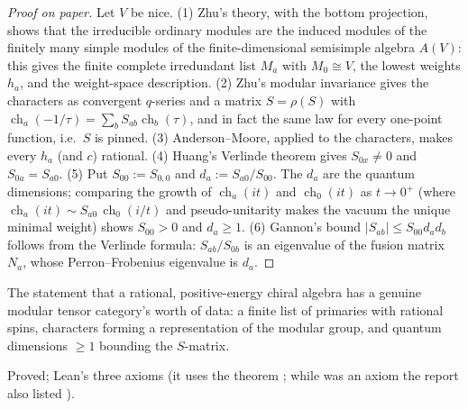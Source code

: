 \begin{proof}[Proof on paper]
Let $V$ be nice. (1) Zhu's theory, with the bottom projection, shows that the irreducible ordinary modules are the
induced modules of the finitely many simple modules of the finite-dimensional semisimple algebra $A(V)$: this gives the
finite complete irredundant list $M_a$ with $M_0\cong V$, the lowest weights $h_a$, and the weight-space description.
(2) Zhu's modular invariance gives the characters as convergent $q$-series and a matrix $S=\rho(S)$ with
$\operatorname{ch}_a(-1/\tau)=\sum_bS_{ab}\operatorname{ch}_b(\tau)$, and in fact the same law for every one-point
function, i.e.\ $S$ is pinned. (3) Anderson--Moore, applied to the characters, makes every $h_a$ (and $c$) rational. (4)
Huang's Verlinde theorem gives $S_{0x}\ne0$ and $S_{0a}=S_{a0}$. (5) Put $S_{00}:=S_{0,0}$ and $d_a:=S_{a0}/S_{00}$. The
$d_a$ are the quantum dimensions; comparing the growth of $\operatorname{ch}_a(it)$ and $\operatorname{ch}_0(it)$ as
$t\to0^+$ (where $\operatorname{ch}_a(it)\sim S_{a0}\,\operatorname{ch}_0(i/t)$ and pseudo-unitarity makes the vacuum
the unique minimal weight) shows $S_{00}>0$ and $d_a\ge1$. (6) Gannon's bound $|S_{ab}|\le S_{00}d_ad_b$ follows from
the Verlinde formula: $S_{ab}/S_{0b}$ is an eigenvalue of the fusion matrix $N_a$, whose Perron--Frobenius eigenvalue is
$d_a$.
\end{proof}

\begin{physics}
The statement that a rational, positive-energy chiral algebra has a genuine modular tensor category's worth of data: a
finite list of primaries with rational spins, characters forming a representation of the modular group, and quantum
dimensions $\ge1$ bounding the $S$-matrix.
\end{physics}

\begin{status}
Proved; Lean's three axioms (it uses the theorem ; while  was an axiom the report also listed ).
\end{status}

